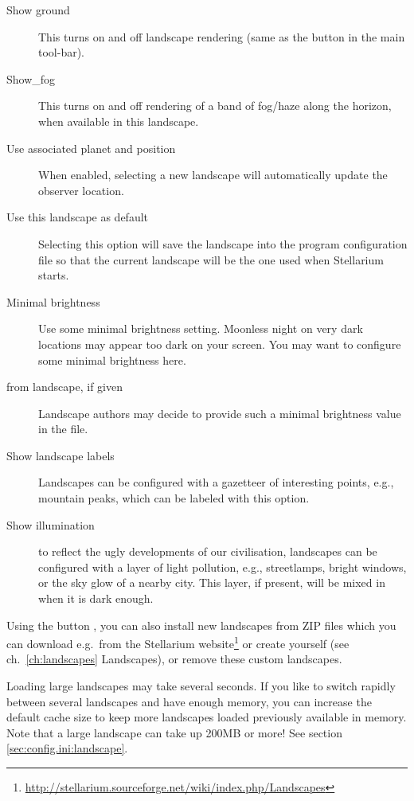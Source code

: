 \begin{description}
\item[Show ground] This turns on and off landscape rendering (same
  as the button  in the main tool-bar).
\item[Show\_fog] This turns on and off rendering of a band of
  fog/haze along the horizon, when available in this landscape.
\item[Use associated planet and position] When enabled, selecting a
  new landscape will automatically update the observer location.
\item[Use this landscape as default] Selecting this option will save
  the landscape into the program configuration file so that the current
  landscape will be the one used when Stellarium starts.
\item[Minimal brightness] Use some minimal brightness
  setting. Moonless night on very dark locations may appear too dark
  on your screen. You may want to configure some minimal brightness
  here.
\item[from landscape, if given] Landscape authors may decide to
  provide such a minimal brightness value in the 
  file.
\item[Show landscape labels] Landscapes can be configured with a
  gazetteer of interesting points, e.g., mountain peaks, which can be
  labeled with this option.
\item[Show illumination] to reflect the ugly developments of our
  civilisation, landscapes can be configured with a layer of light
  pollution, e.g., streetlamps, bright windows, or the sky glow of a
  nearby city. This layer, if present, will be mixed in when it is
  dark enough.
\end{description}

\noindent Using the button , you can also
install new landscapes from ZIP files which you can download e.g.\
from the Stellarium
website\footnote{\url{http://stellarium.sourceforge.net/wiki/index.php/Landscapes}}
or create yourself (see ch.~\ref{ch:landscapes} Landscapes), or remove
these custom landscapes.

Loading large landscapes may take several seconds. 
If you like to switch rapidly between several landscapes and have enough memory, 
you can increase the default cache size to keep more landscapes loaded previously 
available in memory. Note that a large landscape can take up 200MB or more! 
See section \ref{sec:config.ini:landscape}.

